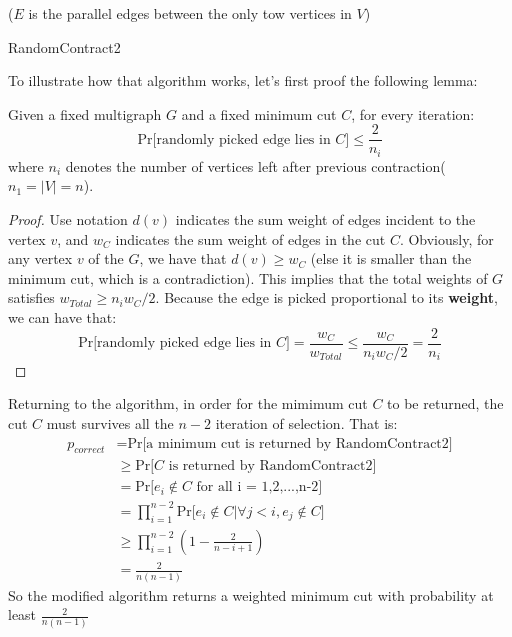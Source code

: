 \documentclass[12pt]{article}
\newenvironment{lemma}[2][Lemma]{\begin{trivlist}
\item[\hskip \labelsep {\bfseries #1}\hskip \labelsep {\bfseries #2.}]}{\end{trivlist}}
\newenvironment{solution}[2][Solution]{\begin{trivlist}
\item[\hskip \labelsep {\bfseries #1}\hskip \labelsep {\bfseries #2.}]}{\end{trivlist}}
\begin{document}
\begin{solution}{1}
    \begin{algorithm}[H]
        ($E$ is the parallel edges between the only tow vertices in $V$)\;
        \caption{RandomContract2} %
    \end{algorithm}
    To illustrate how that algorithm works, let's first proof the following lemma:
    \begin{lemma}{A}
        Given a fixed multigraph $G$ and a fixed minimum cut $C$, for every iteration:
        \begin{equation*}
            \text{Pr[randomly picked edge lies in $C$]} \le \frac{2}{n_i}
        \end{equation*}
        where $n_i$ denotes the number of vertices left after previous contraction($n_1=|V|=n$).
    \end{lemma}
    \begin{proof}
        Use notation $d(v)$ indicates the sum weight of edges incident to the vertex $v$, and $w_C$
        indicates the sum weight of edges in the cut $C$. Obviously, for any
        vertex $v$ of the $G$, we have that $d(v) \ge w_C$ (else it is smaller than the minimum cut, which is a
        contradiction). This implies that the total weights of $G$ satisfies $w_{Total} \ge n_iw_C/2$. Because the
        edge is picked proportional to its \textbf{weight}, we can have that:
        \begin{equation*}
            \text{Pr[randomly picked edge lies in $C$]} = \frac{w_C}{w_{Total}} \le \frac{w_C}{n_iw_C/2} = \frac{2}{n_i}
        \end{equation*}
    \end{proof}
    Returning to the algorithm, in order for the mimimum cut $C$ to be returned, the cut $C$ must
    survives all the $n-2$ iteration of selection. That is:
    \begin{align*}
        p_{correct} & = \text{Pr[a minimum cut is returned by RandomContract2]}                    \\
                    & \ge \text{Pr[$C$ is returned by RandomContract2]}                            \\
                    & = \text{Pr[$e_i \notin C$  for all i = 1,2,...,n-2]}                         \\
                    & = \text{$\prod_{i=1}^{n-2}$Pr[$e_i \notin C | \forall j < i, e_j \notin C$]} \\
                    & \ge \prod_{i=1}^{n-2}(1-\frac{2}{n-i+1})                                     \\
                    & = \frac{2}{n(n-1)}
    \end{align*}
    So the modified algorithm returns a weighted minimum cut with probability at least $\frac2{n(n-1)}$
\end{solution}
\end{document}
